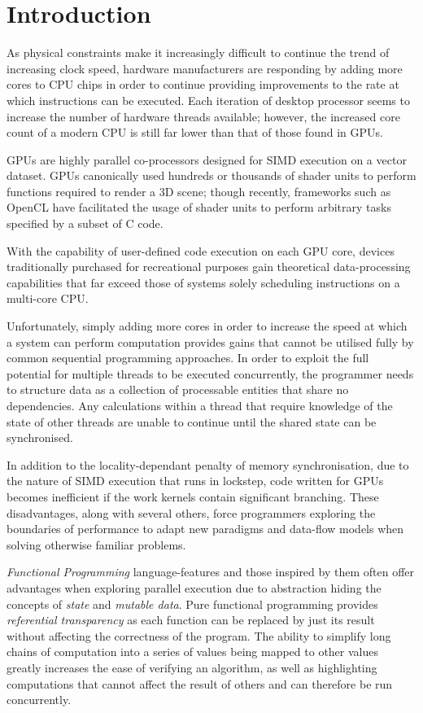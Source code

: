 \section{Introduction}
  As physical constraints make it increasingly difficult to continue the trend of increasing clock speed, hardware manufacturers are responding by adding more cores to \ac{CPU} chips in order to continue providing improvements to the rate at which instructions can be executed. \cite{perf}
  Each iteration of desktop processor seems to increase the number of hardware threads available; however, the increased core count of a modern \ac{CPU} is still far lower than that of those found in \ac{GPUs}.

\ac{GPUs} are highly parallel co-processors designed for \ac{SIMD} execution on a vector dataset.
\ac{GPUs} canonically used hundreds or thousands of shader units to perform functions required to render a 3D scene; though recently, frameworks such as \ac{OpenCL} have facilitated the usage of shader units to perform arbitrary tasks specified by a subset of C code.

 With the capability of user-defined code execution on each GPU core, devices traditionally purchased for recreational purposes gain theoretical data-processing capabilities that far exceed those of systems solely scheduling instructions on a multi-core \ac{CPU}.\cite{mars}

Unfortunately, simply adding more cores in order to increase the speed at which a system can perform computation provides gains that cannot be utilised fully by common sequential programming approaches.
In order to exploit the full potential for multiple threads to be executed concurrently, the programmer needs to structure data as a collection of processable entities that share no dependencies.
Any calculations within a thread that require knowledge of the state of other threads are unable to continue until the shared state can be synchronised.

In addition to the locality-dependant penalty of memory synchronisation, due to the nature of \ac{SIMD} execution that runs in lockstep, code written for \ac{GPUs} becomes inefficient if the work kernels contain significant branching.\cite{branching}
These disadvantages, along with several others, force programmers exploring the boundaries of performance to adapt new paradigms and data-flow models when solving otherwise familiar problems.

\emph{Functional Programming} language-features and those inspired by them often offer advantages when exploring parallel execution\cite{parallelfunction} due to abstraction hiding the concepts of \emph{state} and \emph{mutable data}.
Pure functional programming provides \emph{referential transparency} as each function can be replaced by just its result without affecting the correctness of the program.
The ability to simplify long chains of computation into a series of values being mapped to other values greatly increases the ease of verifying an algorithm, as well as highlighting computations that cannot affect the result of others and can therefore be run concurrently.

